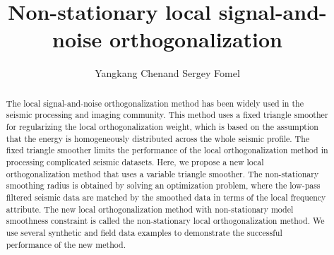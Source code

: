 
\DeclareRobustCommand{\dlo}[1]{}
\DeclareRobustCommand{\wen}[1]{#1}

\title{Non-stationary local signal-and-noise orthogonalization}
\author{Yangkang Chen\footnotemark[1] and Sergey Fomel\footnotemark[2]}

\renewcommand{\thefootnote}{\fnsymbol{footnote}}


\address{
\footnotemark[1]
School of Earth Sciences\\
Zhejiang University\\
Hangzhou, Zhejiang Province, China, 310027\\
chenyk2016@gmail.com \\
\footnotemark[2]Bureau of Economic Geology \\
John A. and Katherine G. Jackson School of Geosciences \\
The University of Texas at Austin \\
University Station, Box X \\
Austin, TX 78713-8924 \\
sergey.fomel@beg.utexas.edu
}




\begin{abstract}
The local signal-and-noise orthogonalization method has been widely used in the seismic processing and imaging community. This method uses a fixed triangle smoother for regularizing the local orthogonalization weight, which is based on the assumption that the energy is homogeneously distributed across the whole seismic profile. The fixed triangle smoother limits the performance of the local orthogonalization method in processing complicated seismic datasets. Here, we propose a new local orthogonalization method that uses a variable triangle smoother. The non-stationary smoothing radius is obtained by solving an optimization problem, where the low-pass filtered seismic data are matched by the smoothed data in terms of the local frequency attribute. The new local orthogonalization method with non-stationary model smoothness constraint is called the non-stationary local orthogonalization method. We use several synthetic and field data examples to demonstrate the successful performance of the new method.
\end{abstract}

